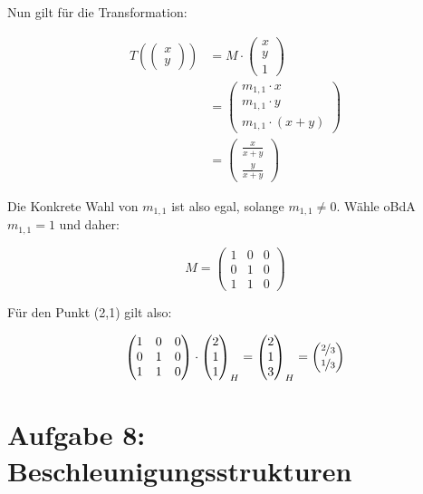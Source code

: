 \documentclass[a4paper]{scrartcl}
\begin{document}
Nun gilt für die Transformation:

\begin{align}
    T(\begin{pmatrix}x\\y\end{pmatrix}) &= M \cdot \begin{pmatrix}x\\y\\1\end{pmatrix}\\
      &= \begin{pmatrix}m_{1,1} \cdot x\\m_{1,1} \cdot y\\m_{1,1} \cdot (x+y)\end{pmatrix}\\
      &= \begin{pmatrix}\frac{x}{x+y}\\\frac{y}{x+y}\end{pmatrix}
\end{align}

Die Konkrete Wahl von $m_{1,1}$ ist also egal, solange $m_{1,1} \neq 0$. Wähle
oBdA $m_{1,1} = 1$ und daher:

\[M = \begin{pmatrix}      1 & 0 & 0\\
                           0 & 1 & 0\\
                           1 & 1 & 0\end{pmatrix}\]

Für den Punkt (2,1) gilt also:

\[\begin{pmatrix}1 & 0 & 0\\
                 0 & 1 & 0\\
                 1 & 1 & 0\end{pmatrix} \cdot \begin{pmatrix}2\\1\\1\end{pmatrix}_H = \begin{pmatrix}2\\1\\3\end{pmatrix}_H = \begin{pmatrix}\nicefrac{2}{3}\\\nicefrac{1}{3}\end{pmatrix}\]


\section*{Aufgabe 8: Beschleunigungsstrukturen}
\end{document}
